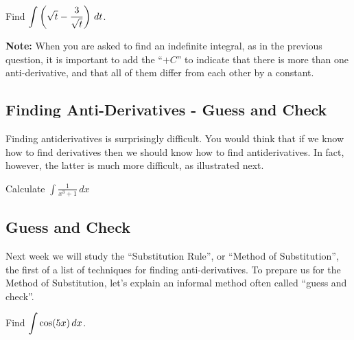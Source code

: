 \newpage
\begin{problem}
	Find $\displaystyle \int\left(\sqrt{t}-\frac{3}{\sqrt{t}}\right)\,dt$.
	
\end{problem}

\vfill
{\bf Note:}  When you are asked to find an indefinite integral, as
in the previous question, it is important to add the ``$+ C$'' to
indicate that there is more than one anti-derivative, and that all
of them differ from each other by a constant.\medskip

\newpage
{}
\subsection*{Finding Anti-Derivatives - Guess and Check}
Finding antiderivatives is surprisingly difficult.  You would think
that if we know how to find derivatives then we should know how to
find antiderivatives.  In fact, however, the latter is much more
difficult, as illustrated next.

\newpage
\begin{problem}
	Calculate $\displaystyle \int \frac{1}{x^3+1}\, dx$
	
\end{problem}

\newpage
\subsection*{Guess and Check}{}
Next week we will study the ``Substitution Rule'', or ``Method of
Substitution'', the first of a list of techniques for finding
anti-derivatives. To prepare us for the Method of Substitution, let's
explain an informal method often called ``guess and check''.

\begin{problem}
	Find $\displaystyle \int \cos (5x)\,dx$.
	
\end{problem}

